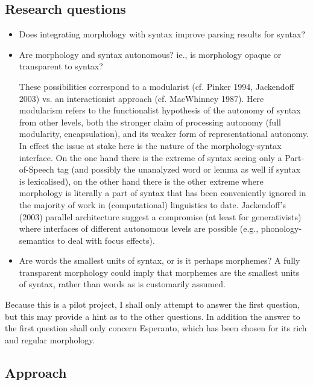 \documentclass[10pt,a4paper]{article}
\begin{document}
\subsection{Research questions}

\begin{itemize}
\item Does integrating morphology with syntax improve parsing results for
syntax?
\item Are morphology and syntax autonomous? ie., is morphology opaque or
transparent to syntax? 

These possibilities correspond to a modularist (cf.
Pinker 1994, Jackendoff 2003) vs. an interactionist approach (cf.  MacWhinney
1987). Here modularism refers to the functionalist hypothesis of the autonomy
of syntax from other levels, both the stronger claim of processing autonomy
(full modularity, encapsulation), and its weaker form of representational
autonomy. In effect the issue at stake here is the nature of the
morphology-syntax interface. On the one hand there is the extreme of syntax
seeing only a Part-of-Speech tag (and possibly the unanalyzed word or lemma as
well if syntax is lexicalised), on the other hand there is the other extreme
where morphology is literally a part of syntax that has been conveniently
ignored in the majority of work in (computational) linguistics to date.
Jackendoff's (2003) parallel architecture suggest a compromise (at least for generativists)
where interfaces of different autonomous levels are possible (e.g.,
phonology-semantics to deal with focus effects).

\item Are words the smallest units of syntax, or is it perhaps morphemes? A
fully transparent morphology could imply that morphemes are the smallest units
of syntax, rather than words as is customarily assumed.
\end{itemize}

Because this is a pilot project, I shall only attempt to answer the first question,
but this may provide a hint as to the other questions. In addition the answer
to the first question shall only concern Esperanto, which has been chosen for its
rich and regular morphology.

\subsection{Approach}
\end{document}
